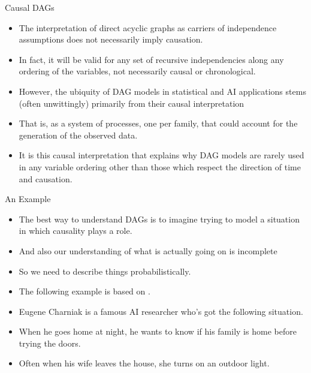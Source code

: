 \documentclass[handout]{beamer}
\begin{document}
\begin{frame}{Causal DAGs}
\scriptsize{
\begin{itemize}


\item The interpretation of direct acyclic graphs as carriers of independence assumptions does not necessarily imply causation.

\item In fact, it will be valid for any set of recursive independencies along any ordering of the variables, not necessarily causal or chronological.

\item However, the ubiquity of DAG models in statistical and AI applications stems (often unwittingly) primarily from their causal interpretation 

\item That is, as a system of processes, one per family, that could account for the generation of the observed data. 

\item It is this causal interpretation that explains why DAG models are rarely used in any variable ordering other than those which respect the direction of time and causation. \cite{pearl2009causality}

\end{itemize}



} 

\end{frame}





\begin{frame}{An Example}
\scriptsize{
\begin{itemize}
\item The best way to understand DAGs is to imagine trying to model a situation in which causality plays a role.
\item And also our understanding of what is actually going on is
incomplete
\item So we need to describe things probabilistically. 

\item The following example is based on \cite{charniak1991bayesian}.

\item Eugene Charniak is a famous AI researcher who's got the following situation.

\item When he goes home at night, he wants to know if his family is home before trying the doors. 

\item Often when his wife leaves the house, she turns on an outdoor light. 

 
\end{itemize}



} 

\end{frame}
\end{document}
